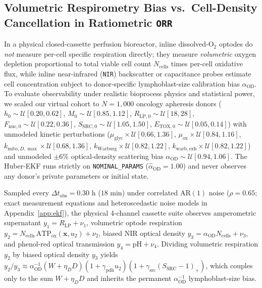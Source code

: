 \documentclass[11pt]{article}
\theoremstyle{plain}
\theoremstyle{remark}
\begin{document}
\subsection{Volumetric Respirometry Bias vs.\ Cell-Density Cancellation in Ratiometric \texttt{ORR}}
In a physical closed-cassette perfusion bioreactor, inline dissolved-$\text{O}_2$ optodes do \emph{not} measure per-cell specific respiration directly; they measure \emph{volumetric} oxygen depletion proportional to total viable cell count $N_{\mathrm{cells}}$ times per-cell oxidative flux, while inline near-infrared (\texttt{NIR}) backscatter or capacitance probes estimate cell concentration subject to donor-specific lymphoblast-size calibration bias $\alpha_{\mathrm{OD}}$. To evaluate observability under realistic bioprocess physics and statistical power, we scaled our virtual cohort to $N = 1{,}000$ oncology apheresis donors ($h_0 \sim \mathcal{U}[0.20, 0.62]$, $M_0 \sim \mathcal{U}[0.85, 1.12]$, $R_{\mathrm{LP},0} \sim \mathcal{U}[18, 28]$, $F_{\mathrm{nuc},0} \sim \mathcal{U}[0.22, 0.36]$, $S_{\mathrm{SRC},0} \sim \mathcal{U}[1.05, 1.50]$, $E_{\mathrm{TOX},0} \sim \mathcal{U}[0.05, 0.14]$) with unmodeled kinetic perturbations ($\mu_{\mathrm{glyc}} \times \mathcal{U}[0.66, 1.36]$, $\mu_{\mathrm{ox}} \times \mathcal{U}[0.84, 1.16]$, $k_{\mathrm{mito},D,\max} \times \mathcal{U}[0.68, 1.36]$, $k_{\mathrm{Warburg}} \times \mathcal{U}[0.82, 1.22]$, $k_{\mathrm{warb,exh}} \times \mathcal{U}[0.82, 1.22]$) and unmodeled $\pm 6\%$ optical-density scattering bias $\alpha_{\mathrm{OD}} \sim \mathcal{U}[0.94, 1.06]$. The Huber-EKF runs strictly on \texttt{NOMINAL\_PARAMS} ($\hat{\alpha}_{\mathrm{OD}} = 1.00$) and never observes any donor's private parameters or initial state.

Sampled every $\Delta t_{\mathrm{obs}} = 0.30\text{ h}$ ($18\text{ min}$) under correlated $\mathrm{AR}(1)$ noise ($\rho = 0.65$; exact measurement equations and heteroscedastic noise models in Appendix~\ref{app:ekf}), the physical 4-channel cassette suite observes amperometric supernatant $y_1 = R_{\mathrm{LP}} + \nu_1$, volumetric optode respiration $y_2 = N_{\mathrm{cells}}\,\mathrm{ATP}_{\mathrm{ox}}(\mathbf{x}, u_2) + \nu_2$, biased NIR optical density $y_3 = \alpha_{\mathrm{OD}} N_{\mathrm{cells}} + \nu_3$, and phenol-red optical transmission $y_4 = \mathrm{pH} + \nu_4$. Dividing volumetric respiration $y_2$ by biased optical density $y_3$ yields $y_2 / y_3 \approx \alpha_{\mathrm{OD}}^{-1}(W + \eta_D D)(1 + \gamma_{\mathrm{pdh}}u_2)(1 + \gamma_{\mathrm{src}}(S_{\mathrm{SRC}}-1)_+)$, which couples only to the sum $W + \eta_D D$ and inherits the permanent $\alpha_{\mathrm{OD}}^{-1}$ lymphoblast-size bias.
\end{document}
